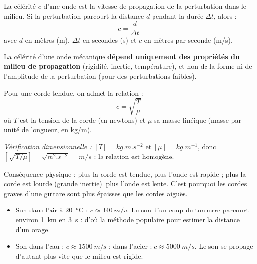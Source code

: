 \documentclass[11pt]{article}
\newcommand{\cle}[1]{{\popxbold\color{popdark}#1}}
\newcounter{popsec}
\newcounter{popsub}
\newcommand{\courssub}[1]{%
  \stepcounter{popsub}%
  \par\vspace{9pt}\noindent{\popxbold\fontsize{11.5}{13}\selectfont\color{popink}{\color{poporange}\thepopsec.\thepopsub}\hspace{6pt}#1}\par\nopagebreak\vspace{4pt}
}
\begin{document}
\courssub{Célérité d'une onde}

\begin{definition}[Célérité]
La \cle{célérité} $c$ d'une onde est la vitesse de propagation de la perturbation dans le milieu. Si la perturbation parcourt la distance $d$ pendant la durée $\Delta t$, alors :
\[ c = \dfrac{d}{\Delta t} \]
avec $d$ en mètres (\si{m}), $\Delta t$ en secondes (\si{s}) et $c$ en mètres par seconde (\si{m/s}).
\end{definition}

\begin{propriete}
La célérité d'une onde mécanique \textbf{dépend uniquement des propriétés du milieu de propagation} (rigidité, inertie, température), et non de la forme ni de l'amplitude de la perturbation (pour des perturbations faibles).

Pour une corde tendue, on admet la relation :
\[ c = \sqrt{\dfrac{T}{\mu}} \]
où $T$ est la tension de la corde (en newtons) et $\mu$ sa masse linéique (masse par unité de longueur, en \si{kg/m}).

\emph{Vérification dimensionnelle :} $[T] = \si{kg.m.s^{-2}}$ et $[\mu] = \si{kg.m^{-1}}$, donc $\left[\sqrt{T/\mu}\right] = \sqrt{\si{m^2.s^{-2}}} = \si{m/s}$ : la relation est homogène.

Conséquence physique : plus la corde est tendue, plus l'onde est rapide ; plus la corde est lourde (grande inertie), plus l'onde est lente. C'est pourquoi les cordes graves d'une guitare sont plus épaisses que les cordes aiguës.
\end{propriete}

\begin{exemplebox}
\begin{itemize}
\item Son dans l'air à \SI{20}{\celsius} : $c \approx \SI{340}{m/s}$. Le son d'un coup de tonnerre parcourt environ \SI{1}{km} en \SI{3}{s} : d'où la méthode populaire pour estimer la distance d'un orage.
\item Son dans l'eau : $c \approx \SI{1500}{m/s}$ ; dans l'acier : $c \approx \SI{5000}{m/s}$. Le son se propage d'autant plus vite que le milieu est rigide.
\end{itemize}
\end{exemplebox}
\end{document}
